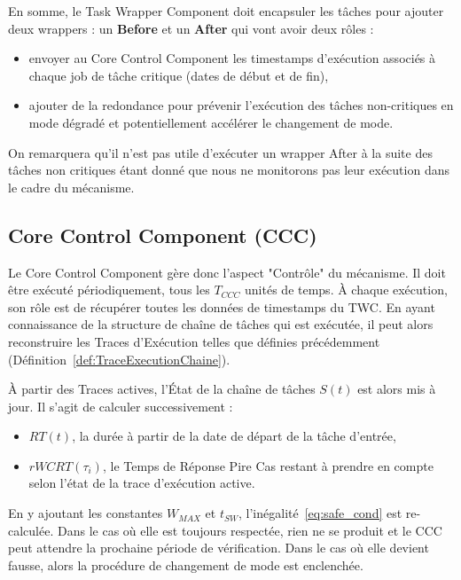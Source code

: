 \documentclass[french, a4paper, 11pt, twoside, pdftex]{StyleThese}
\begin{document}
        En somme, le Task Wrapper Component doit encapsuler les tâches pour ajouter deux wrappers : un \textbf{Before} et un \textbf{After} qui vont avoir deux rôles : 
        \begin{itemize}
        	\item envoyer au Core Control Component les timestamps d'exécution associés à chaque job de tâche critique (dates de début et de fin),
        	\item ajouter de la redondance pour prévenir l'exécution des tâches non-critiques en mode dégradé et potentiellement accélérer le changement de mode.
        \end{itemize}
		On remarquera qu'il n'est pas utile d'exécuter un wrapper After à la suite des tâches non critiques étant donné que nous ne monitorons pas leur exécution dans le cadre du mécanisme.

        \subsection{Core Control Component (CCC)}
        
        Le Core Control Component gère donc l'aspect "Contrôle" du mécanisme. Il doit être exécuté périodiquement, tous les $T_{CCC}$ unités de temps. À chaque exécution, son rôle est de récupérer toutes les données de timestamps du TWC. En ayant connaissance de la structure de chaîne de tâches qui est exécutée, il peut alors reconstruire les Traces d'Exécution telles que définies précédemment (Définition~\ref{def:TraceExecutionChaine}).
        
        À partir des Traces actives, l'État de la chaîne de tâches $S(t)$ est alors mis à jour. Il s'agit de calculer successivement : 
        \begin{itemize}
        	\item $RT(t)$, la durée à partir de la date de départ de la tâche d'entrée,
        	\item $rWCRT(\tau_i)$, le Temps de Réponse Pire Cas restant à prendre en compte selon l'état de la trace d'exécution active.
        \end{itemize} 
	    En y ajoutant les constantes $W_{MAX}$ et $t_{SW}$, l'inégalité~\ref{eq:safe_cond} est re-calculée.
        Dans le cas où elle est toujours respectée, rien ne se produit et le CCC peut attendre la prochaine période de vérification. Dans le cas où elle devient fausse, alors la procédure de changement de mode est enclenchée. %
\end{document}
